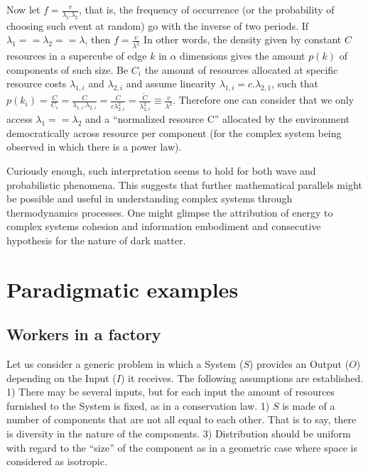 \documentclass[a4paper, 11pt]{article} %
\begin{document}
Now let $f=\frac{v}{\lambda_1 . \lambda_2}$, that is,
the frequency of occurrence
(or the probability of choosing such event at random) go with the inverse of two periods. 
If $\lambda_1==\lambda_2==\lambda$, then $f=\frac{v}{\lambda^2}$
In other words, the density given by constant $C$ 
resources in a supercube of
edge $k$ in $\alpha$ dimensions gives the amount $p(k)$ of components
of such size.
Be $C_i$ the amount of resources allocated at
specific resource costs $\lambda_{1,i}$ and $\lambda_{2,i}$
and assume
linearity $\lambda_{1,i}=c.\lambda_{2,1}$,
such that
$p(k_i)=\frac{C}{C_i}=\frac{C}{\lambda_{1,i}.\lambda_{2,i}}=
\frac{C}{c\lambda_{2,i}^2}=\frac{\widetilde{C}}{\lambda_{2,i}^2}\equiv\frac{v}{\lambda^2}$.
Therefore one can consider that we only access $\lambda_1==\lambda_2$ and a ``normalized resource C'' allocated by the environment democratically across resource per component (for the complex system being observed in which there is a power law).

Curiously enough, such interpretation seems to hold for 
both wave and probabilistic phenomena.
This suggests that further mathematical
parallels might be possible and useful in understanding complex
systems through thermodynamics processes.
One might glimpse the attribution of energy to complex systems
cohesion and information embodiment and consecutive 
hypothesis for the nature of dark matter.

\section{Paradigmatic examples}
\subsection{Workers in a factory}
Let us consider a generic problem in which a System ($S$) provides an Output ($O$) depending on the Input ($I$) it receives. The following assumptions are established.
1) There may be several inputs, but for each input the amount of resources furnished to the System is fixed, as in a conservation law. 
1) $S$ is made of a number of components that are not all equal to each other. That is to say, there is diversity in the nature of the components. 
3) Distribution should be uniform with regard to the “size” of the component as in a geometric case where space is considered as isotropic. 
\end{document}
